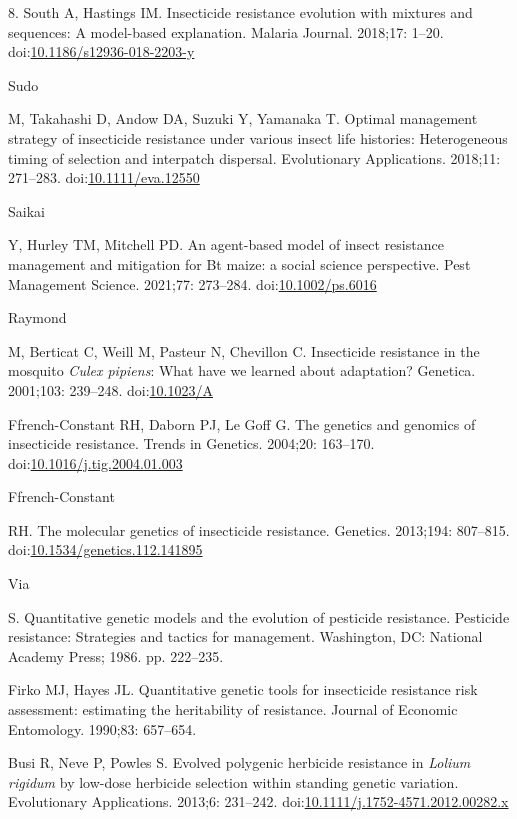 \documentclass[10pt,letterpaper]{article}
\begin{document}
\begin{thebibliography}{30}
8. South A, Hastings IM. {Insecticide resistance evolution with mixtures and sequences: A model-based explanation}. Malaria Journal. 2018;17: 1--20. doi:\href{https://doi.org/10.1186/s12936-018-2203-y}{10.1186/s12936-018-2203-y}

\hypertarget{ref-Sudo2018}{Sudo} M, Takahashi D, Andow DA, Suzuki Y, Yamanaka T. {Optimal management strategy of insecticide resistance under various insect life histories: Heterogeneous timing of selection and interpatch dispersal}. Evolutionary Applications. 2018;11: 271--283. doi:\href{https://doi.org/10.1111/eva.12550}{10.1111/eva.12550}

\hypertarget{ref-Saikai2021}{Saikai} Y, Hurley TM, Mitchell PD. {An agent-based model of insect resistance management and mitigation for Bt maize: a social science perspective}. Pest Management Science. 2021;77: 273--284. doi:\href{https://doi.org/10.1002/ps.6016}{10.1002/ps.6016}

\hypertarget{ref-Raymond2001}{Raymond} M, Berticat C, Weill M, Pasteur N, Chevillon C. {Insecticide resistance in the mosquito \textit{Culex pipiens}: What have we learned about adaptation?} Genetica. 2001;103: 239--248. doi:\href{https://doi.org/10.1023/A}{10.1023/A}

Ffrench-Constant RH, Daborn PJ, Le Goff G. {The genetics and genomics of insecticide resistance}. Trends in Genetics. 2004;20: 163--170. doi:\href{https://doi.org/10.1016/j.tig.2004.01.003}{10.1016/j.tig.2004.01.003}

\hypertarget{ref-Ffrench-Constant2013}{Ffrench-Constant} RH. {The molecular genetics of insecticide resistance}. Genetics. 2013;194: 807--815. doi:\href{https://doi.org/10.1534/genetics.112.141895}{10.1534/genetics.112.141895}

\hypertarget{ref-Via1986}{Via} S. {Quantitative genetic models and the evolution of pesticide resistance}. Pesticide resistance: Strategies and tactics for management. Washington, DC: National Academy Press; 1986. pp. 222--235.

Firko MJ, Hayes JL. {Quantitative genetic tools for insecticide resistance risk assessment: estimating the heritability of resistance}. Journal of Economic Entomology. 1990;83: 657--654.

Busi R, Neve P, Powles S. {Evolved polygenic herbicide resistance in \textit{Lolium rigidum} by low-dose herbicide selection within standing genetic variation}. Evolutionary Applications. 2013;6: 231--242. doi:\href{https://doi.org/10.1111/j.1752-4571.2012.00282.x}{10.1111/j.1752-4571.2012.00282.x}


\end{thebibliography}
\end{document}
